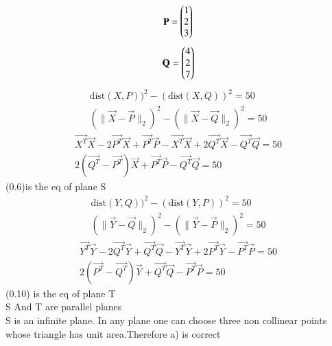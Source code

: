\documentclass[journal]{IEEEtran}
\begin{document}
\begin{align}
                                     \mathbf{P}= \begin{pmatrix}
                                             1
                                              \\
                                              2
                                               \\
                                               3
                                              \end{pmatrix}
\end{align}
\begin{align}
                                     \mathbf{Q}= \begin{pmatrix}
                                             4
                                              \\
                                              2
                                               \\
                                               7
                                              \end{pmatrix}
\end{align}
\begin{align}
 \text{dist}(X,P))^2 - (\text{dist}(X,Q))^2 = 50 \\
 (\|\vec{X}-\vec{P}\|_2)^2- (\|\vec{X}-\vec{Q}\|_2)^2=50
\end{align}
\begin{align}
\vec{X^T}\vec{X}-2\vec{P^T}\vec{X}+\vec{P^T}\vec{P}-\vec{X^T}\vec{X}
+2\vec{Q^T}\vec{X}-\vec{Q^T}\vec{Q}=50\\
2(\vec{Q^T}-\vec{P^T})\vec{X}+\vec{P^T}\vec{P}-\vec{Q^T}\vec{Q}=50
\end{align}
(0.6)is the eq of plane S
\begin{align}
\text{dist}(Y,Q))^2 - (\text{dist}(Y,P))^2 = 50\\
 (\|\vec{Y}-\vec{Q}\|_2)^2- (\|\vec{Y}-\vec{P}\|_2)^2=50
\end{align}
\begin{align}
\vec{Y^T}\vec{Y}-2\vec{Q^T}\vec{Y}+\vec{Q^T}\vec{Q}-\vec{Y^T}\vec{Y}
+2\vec{P^T}\vec{Y}-\vec{P^T}\vec{P}=50\\
2(\vec{P^T}-\vec{Q^T})\vec{Y}+\vec{Q^T}\vec{Q}-\vec{P^T}\vec{P}=50
\end{align}
(0.10) is the eq of plane T\\
S And T are parallel planes\\
S is an infinite plane. In any plane one can choose three non collinear points whose triangle has unit area.Therefore a) is correct 
\\
\\
\end{document}
